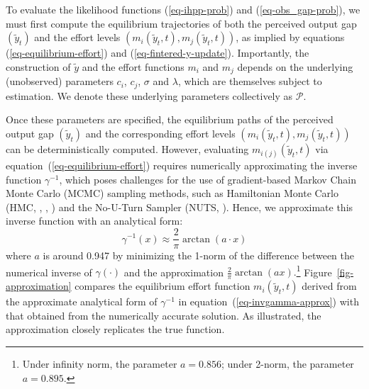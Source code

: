 \documentclass[mnsc]{informs3}
\begin{document}
To evaluate the likelihood functions (\ref{eq-ihpp-prob}) and (\ref{eq-obs_gap-prob}), we must first compute the equilibrium trajectories of both the perceived output gap $(\tilde{y}_t)$ and the effort levels $(m_i(\tilde{y}_t, t), m_j(\tilde{y}_t, t))$, as implied by equations (\ref{eq-equilibrium-effort}) and (\ref{eq-fintered-y-update}). 
Importantly, the construction of $\tilde{y}$ and the effort functions $m_i$ and $m_j$ depends on the underlying (unobserved) parameters $c_i$, $c_j$, $\sigma$ and $\lambda$, which are themselves subject to estimation.
We denote these underlying parameters collectively as $\mathcal{P}$. 

Once these parameters are specified, the equilibrium paths of the perceived output gap $(\tilde{y}_t)$ and the corresponding effort levels $(m_i(\tilde{y}_t, t), m_j(\tilde{y}_t, t))$ can be deterministically computed. 
However, evaluating $m_{i(j)}(\tilde{y}_t, t)$ via equation~(\ref{eq-equilibrium-effort}) requires numerically approximating the inverse function $\gamma^{-1}$, which poses challenges for the use of gradient-based Markov Chain Monte Carlo (MCMC) sampling methods, such as Hamiltonian Monte Carlo (HMC, \citealt{neal1996bayesian}, \citealt{neal2011mcmc}, \citealt{betancourt2017conceptual}) and the No-U-Turn Sampler (NUTS, \citealt{hoffman2014NUTS}).
Hence, we approximate this inverse function with an analytical form:
\begin{equation}\label{eq-invgamma-approx}
\gamma^{-1}(x) \approx \frac{2}{\pi}\arctan(a \cdot x)
\end{equation}
where $a$ is around 0.947 by minimizing the 1-norm of the difference between the numerical inverse of $\gamma(\cdot)$ and the approximation $\frac{2}{\pi} \arctan(a x).$\footnote{Under infinity norm, the parameter $a = 0.856$; under 2-norm, the parameter $a=0.895$.}
Figure~\ref{fig-approximation} compares the equilibrium effort function $m_i(\tilde{y}_t, t)$ derived from the approximate analytical form of $\gamma^{-1}$ in equation~(\ref{eq-invgamma-approx}) with that obtained from the numerically accurate solution.
As illustrated, the approximation closely replicates the true function.
\end{document}

